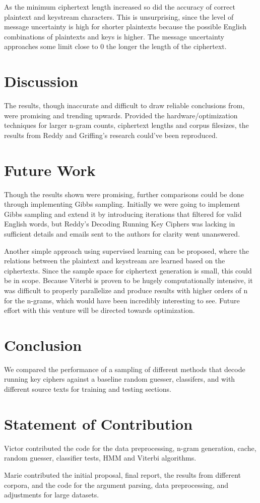 \documentclass[11pt,letterpaper]{article}
\begin{document}
As the minimum ciphertext length increased so did the accuracy of correct plaintext and keystream characters. This is unsurprising, since the level of message uncertainty is high for shorter plaintexts because the possible English combinations of plaintexts and keys is higher. The message uncertainty approaches some limit close to 0 the longer the length of the ciphertext.

\section{Discussion}
The results, though inaccurate and difficult to draw reliable conclusions from, were promising and trending upwards. Provided the hardware/optimization techniques for larger n-gram counts, ciphertext lengths and corpus filesizes, the results from Reddy \cite{Reddy:12} and Griffing's \cite{Griffing:06} research could've been reproduced.

\section{Future Work}
Though the results shown were promising, further comparisons could be done through implementing Gibbs sampling. Initially we were going to implement Gibbs sampling and extend it by introducing iterations that filtered for valid English words, but Reddy's Decoding Running Key Ciphers \cite{Reddy:12} was lacking in sufficient details and emails sent to the authors for clarity went unanswered.

 Another simple approach using supervised learning can be proposed, where the relations between the plaintext and keystream are learned based on the ciphertexts. Since the sample space for ciphertext generation is small, this could be in scope. Because Viterbi is proven to be hugely computationally intensive, it was difficult to properly parallelize and produce results with higher orders of n for the n-grams, which would have been incredibly interesting to see. Future effort with this venture will be directed towards optimization.

\section{Conclusion}
We compared the performance of a sampling of different methods that decode running key ciphers against a baseline random guesser, classifers, and with different source texts for training and testing sections. 

\section{Statement of Contribution}
Victor contributed the code for the data preprocessing, n-gram generation, cache, random guesser, classifier tests, HMM and Viterbi algorithms.

Marie contributed the initial proposal, final report, the results from different corpora, and the code for the argument parsing, data preprocessing, and adjustments for large datasets.



\end{document}
